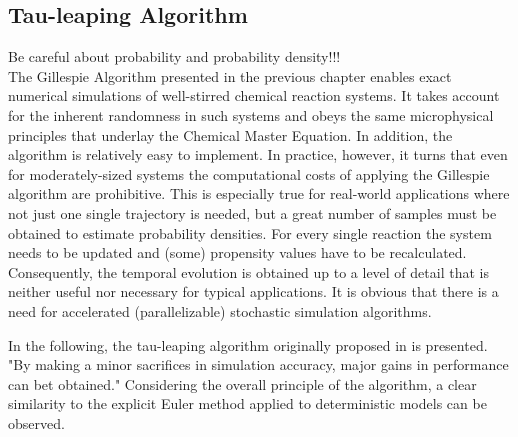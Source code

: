 \subsection{Tau-leaping Algorithm}
\ifdebug
Be careful about probability and probability density!!! \\
\fi
The Gillespie Algorithm presented in the previous chapter enables exact numerical simulations of well-stirred chemical reaction systems. It takes account for the inherent randomness in such systems and obeys the same microphysical principles that underlay the Chemical Master Equation. In addition, the algorithm is relatively easy to implement. In practice, however, it turns that even for moderately-sized systems the computational costs of applying the Gillespie algorithm are prohibitive. This is especially true for real-world applications where not just one single trajectory is needed, but a great number of samples must be obtained to estimate probability densities. For every single reaction the system needs to be updated and (some) propensity values have to be recalculated. Consequently, the temporal evolution is obtained up to a level of detail that is neither useful nor necessary for typical applications. It is obvious that there is a need for accelerated (parallelizable) stochastic simulation algorithms. 

In the following, the tau-leaping algorithm originally proposed in \cite{gillespie_approximate_2001} is presented. "By making a minor sacrifices in simulation accuracy, major gains in performance can bet obtained." Considering the overall principle of the algorithm, a clear similarity to the explicit Euler method applied to deterministic models can be observed. 


